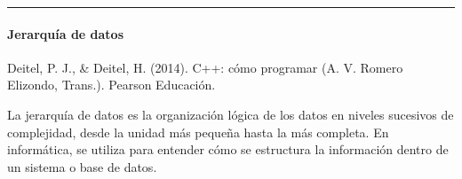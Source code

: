 \documentclass[letterpaper,10pt,spanish]{sphinxmanual}
\begin{document}
\bigskip\hrule\bigskip



\paragraph{Jerarquía de datos}
\label{\detokenize{cursos/ofimatica11/recursos/T01:jerarquia-de-datos}}
\sphinxAtStartPar
%
\begin{footnote}[2]\sphinxAtStartFootnote
Deitel, P. J., \& Deitel, H. (2014). C++: cómo programar (A. V. Romero Elizondo, Trans.). Pearson Educación.
%
\end{footnote} La jerarquía de datos es la organización lógica de los datos en niveles sucesivos de complejidad, desde la unidad más pequeña hasta la más completa. En informática, se utiliza para entender cómo se estructura la información dentro de un sistema o base de datos.
\end{document}
